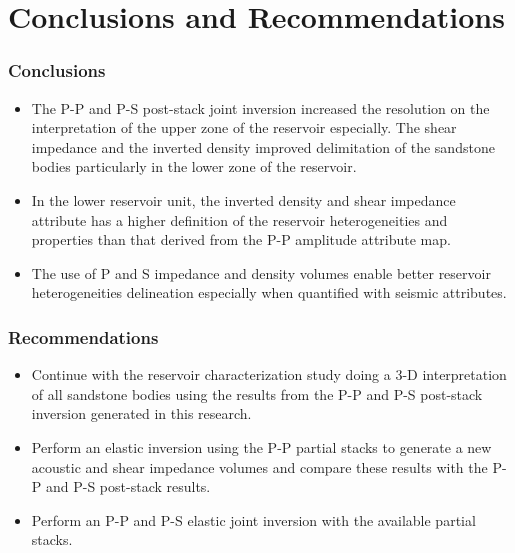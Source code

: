 \chapter{Conclusions and Recommendations}

\subsection{Conclusions}

\begin{itemize}

\item The P-P and P-S post-stack joint inversion increased the resolution on the interpretation of the upper zone of the reservoir especially. The shear impedance and the inverted density improved delimitation of the sandstone bodies particularly in the lower zone of the reservoir.

\item In the lower reservoir unit, the inverted density and shear impedance attribute has a higher definition of the reservoir heterogeneities and properties than that derived from the P-P amplitude attribute map.

\item The use of P and S impedance and density volumes enable better reservoir heterogeneities delineation especially when quantified with seismic attributes. 

\end{itemize} 

\subsection{Recommendations}

\begin{itemize}

\item Continue with the reservoir characterization study doing a 3-D interpretation of all sandstone bodies using the results from the P-P and P-S post-stack inversion generated in this research.

\item Perform an elastic inversion using the P-P partial stacks to generate a new acoustic and shear impedance volumes and compare these results with the P-P and P-S post-stack results.

\item Perform an P-P and P-S elastic joint inversion with the available partial stacks.

 

\end{itemize}

